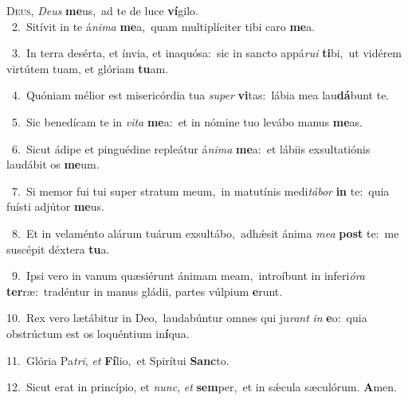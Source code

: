 \lettrine{\initial\textcolor{\initialcolor}{D}}{eus,} \textit{De}\-\textit{us} \textbf{me}\-us,~\star ad te de luce \textbf{ví}\-gilo.\\
{\numbfont\textcolor{\numbcolor}{~2.}}~Sitívit in te á\-\textit{ni}\-\textit{ma} \textbf{me}\-a,~\star quam multiplíciter tibi caro \textbf{me}\-a.\par
{\numbfont\textcolor{\numbcolor}{~3.}}~In terra desérta, et ínvia, et inaquósa:~\dagger sic in sancto appá\-\textit{ru}\-\textit{i} \textbf{ti}\-bi,~\star ut vidérem virtútem tuam, et glóriam \textbf{tu}\-am.\par
{\numbfont\textcolor{\numbcolor}{~4.}}~Quóniam mélior est misericórdia tua \textit{su}\-\textit{per} \textbf{vi}\-tas:~\star lábia mea lau\-\textbf{dá}\-bunt te.\par
{\numbfont\textcolor{\numbcolor}{~5.}}~Sic benedícam te in \textit{vi}\-\textit{ta} \textbf{me}\-a:~\star et in nómine tuo levábo manus \textbf{me}\-as.\par
{\numbfont\textcolor{\numbcolor}{~6.}}~Sicut ádipe et pinguédine repleátur á\-\textit{ni}\-\textit{ma} \textbf{me}\-a:~\star et lábiis exsultatiónis laudábit os \textbf{me}\-um.\par
{\numbfont\textcolor{\numbcolor}{~7.}}~Si memor fui tui super stratum meum,~\dagger in matutínis medi\-\textit{tá}\-\textit{bor} \textbf{in} te:~\star quia fuísti adjútor \textbf{me}\-us.\par
{\numbfont\textcolor{\numbcolor}{~8.}}~Et in velaménto alárum tuárum exsultábo,~\dagger adhǽsit ánima \textit{me}\-\textit{a} \textbf{post} te:~\star me suscépit déxtera \textbf{tu}\-a.\par
{\numbfont\textcolor{\numbcolor}{~9.}}~Ipsi vero in vanum quæsiérunt ánimam meam,~\dagger introíbunt in inferi\-\textit{ó}\-\textit{ra} \textbf{ter}\-ræ:~\star tradéntur in manus gládii, partes vúlpium \textbf{e}\-runt.\par
{\numbfont\textcolor{\numbcolor}{10.}}~Rex vero lætábitur in Deo,~\dagger laudabúntur omnes qui ju\textit{rant} \textit{in} \textbf{e}\-o:~\star quia obstrúctum est os loquéntium in\-\textbf{í}\-qua.\par
{\numbfont\textcolor{\numbcolor}{11.}}~Glória Pa\-\textit{tri}\-, \textit{et} \textbf{Fí}\-lio,~\star et Spirítui \textbf{Sanc}\-to.\par
{\numbfont\textcolor{\numbcolor}{12.}}~Sicut erat in princípio, et \textit{nunc}\-, \textit{et} \textbf{sem}\-per,~\star et in sǽcula sæculórum. \textbf{A}\-men.\par
